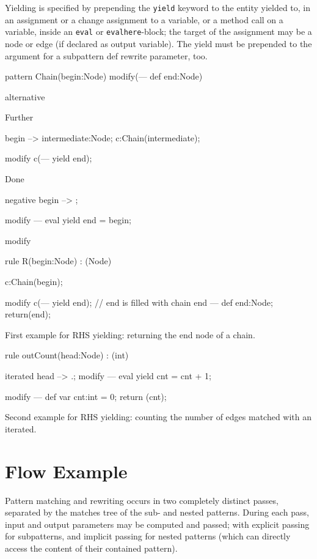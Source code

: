 Yielding is specified by prepending the \texttt{yield} keyword to the entity yielded to,
in an assignment or a change assignment to a variable, or a method call on a variable,
inside an \texttt{eval} or \texttt{evalhere}-block; 
the target of the assignment may be a node or edge (if declared as output variable).
The yield must be prepended to the argument for a subpattern def rewrite parameter, too.

\begin{example}
  \begin{grgen}
pattern Chain(begin:Node) modify(--- def end:Node)
{
  alternative {
    Further {
      begin --> intermediate:Node;
      c:Chain(intermediate);
      
      modify {
        c(--- yield end);
      }
    }
    Done {
      negative {
        begin --> ;
      }
      
      modify {
			---
        eval {
          yield end = begin;
        }
      }
    }
  }
  
  modify { }
}

rule R(begin:Node) : (Node) {
  c:Chain(begin);

  modify {
    c(--- yield end); // end is filled with chain end
  ---
    def end:Node;
    return(end);
  }
}
  \end{grgen}
  First example for RHS yielding: returning the end node of a chain.
\end{example}

\begin{example}
  \begin{grgen}
rule outCount(head:Node) : (int)
{
  iterated {
    head --> .;
    modify {
		---
      eval { yield cnt = cnt + 1; }
    }
  }

  modify {
	---
    def var cnt:int = 0;
    return (cnt);
  }
}
  \end{grgen}
  Second example for RHS yielding: counting the number of edges matched with an iterated.
\end{example}



\section{Flow Example}\label{matchingflow}

Pattern matching and rewriting occurs in two completely distinct passes, separated by the matches tree of the sub- and nested patterns.
During each pass, input and output parameters may be computed and passed; with explicit passing for subpatterns, and implicit passing for nested patterns (which can directly access the content of their contained pattern).


